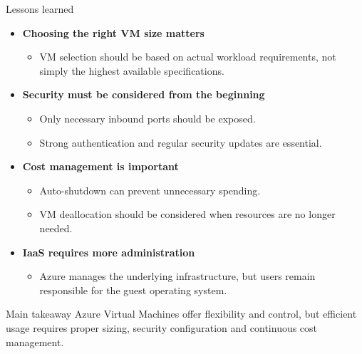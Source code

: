 \documentclass[aspectratio=169,xcolor=dvipsnames]{beamer}
\begin{document}
\begin{frame}{Lessons learned}
\begin{itemize}
    \item \textbf{Choosing the right VM size matters}
    \begin{itemize}
        \item VM selection should be based on actual workload requirements,
        not simply the highest available specifications.
    \end{itemize}

    \item \textbf{Security must be considered from the beginning}
    \begin{itemize}
        \item Only necessary inbound ports should be exposed.
        \item Strong authentication and regular security updates are essential.
    \end{itemize}

    \item \textbf{Cost management is important}
    \begin{itemize}
        \item Auto-shutdown can prevent unnecessary spending.
        \item VM deallocation should be considered when resources are no longer needed.
    \end{itemize}

    \item \textbf{IaaS requires more administration}
    \begin{itemize}
        \item Azure manages the underlying infrastructure,
        but users remain responsible for the guest operating system.
    \end{itemize}
\end{itemize}

\vspace{0.3cm}
\begin{block}{Main takeaway}
Azure Virtual Machines offer flexibility and control,
but efficient usage requires proper sizing, security
configuration and continuous cost management.
\end{block}
\end{frame}
\end{document}
